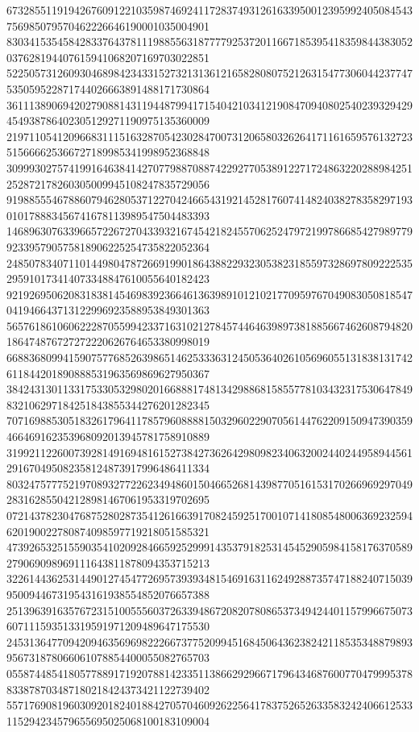 \begin{DoxyCode}
      673285511919426760912210359874692411728374931261633950012395992405084543756985079570462226646190001035004901
      830341535458428337643781119885563187777925372011667185395418359844383052037628194407615941068207169703022851
      522505731260930468984234331527321313612165828080752126315477306044237747535059522871744026663891488171730864
      361113890694202790881431194487994171540421034121908470940802540239329429454938786402305129271190975135360009
      219711054120966831115163287054230284700731206580326264171161659576132723515666625366727189985341998952368848
      309993027574199164638414270779887088742292770538912271724863220288984251252872178260305009945108247835729056
      919885554678860794628053712270424665431921452817607414824038278358297193010178883456741678113989547504483393
      146896307633966572267270433932167454218245570625247972199786685427989779923395790575818906225254735822052364
      248507834071101449804787266919901864388229323053823185597328697809222535295910173414073348847610055640182423
      921926950620831838145469839236646136398910121021770959767049083050818547041946643713122996923588953849301363
      565761861060622287055994233716310212784574464639897381885667462608794820186474876727272220626764653380998019
      668836809941590757768526398651462533363124505364026105696055131838131742611844201890888531963569869627950367
      384243130113317533053298020166888174813429886815855778103432317530647849832106297184251843855344276201282345
      707169885305183261796411785796088881503296022907056144762209150947390359466469162353968092013945781758910889
      319921122600739281491694816152738427362642980982340632002440244958944561291670495082358124873917996486411334
      803247577752197089327722623494860150466526814398770516153170266969297049283162855042128981467061953319702695
      072143782304768752802873541261663917082459251700107141808548006369232594620190022780874098597719218051585321
      473926532515590354102092846659252999143537918253145452905984158176370589279069098969111643811878094353715213
      322614436253144901274547726957393934815469163116249288735747188240715039950094467319543161938554852076657388
      251396391635767231510055560372633948672082078086537349424401157996675073607111593513319591971209489647175530
      245313647709420946356969822266737752099451684506436238242118535348879893956731878066061078854400055082765703
      055874485418057788917192078814233511386629296671796434687600770479995378833878703487180218424373421122739402
      557176908196030920182401884270570460926225641783752652633583242406612533115294234579655695025068100183109004

\end{DoxyCode}
